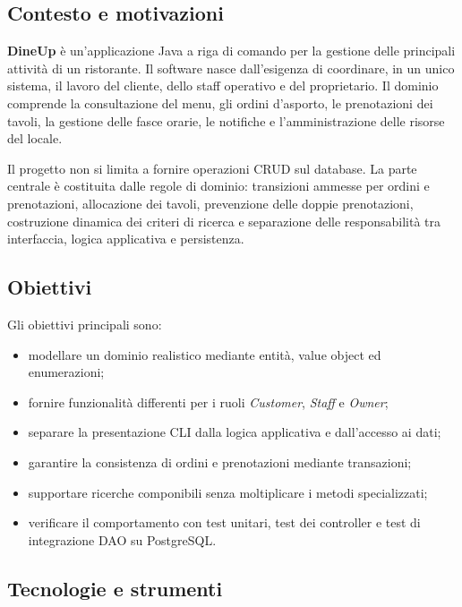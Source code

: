 \documentclass[12pt,a4paper]{article}
\newcommand{\project}{\textbf{DineUp}}
\begin{document}
\subsection{Contesto e motivazioni}

\project{} è un'applicazione Java a riga di comando per la gestione delle principali
attività di un ristorante. Il software nasce dall'esigenza di coordinare, in un unico
sistema, il lavoro del cliente, dello staff operativo e del proprietario. Il dominio
comprende la consultazione del menu, gli ordini d'asporto, le prenotazioni dei tavoli,
la gestione delle fasce orarie, le notifiche e l'amministrazione delle risorse del locale.

Il progetto non si limita a fornire operazioni CRUD sul database. La parte centrale è
costituita dalle regole di dominio: transizioni ammesse per ordini e prenotazioni,
allocazione dei tavoli, prevenzione delle doppie prenotazioni, costruzione dinamica dei
criteri di ricerca e separazione delle responsabilità tra interfaccia, logica applicativa
e persistenza.

\subsection{Obiettivi}

Gli obiettivi principali sono:

\begin{itemize}[leftmargin=*]
  \item modellare un dominio realistico mediante entità, value object ed enumerazioni;
  \item fornire funzionalità differenti per i ruoli \emph{Customer}, \emph{Staff} e
        \emph{Owner};
  \item separare la presentazione CLI dalla logica applicativa e dall'accesso ai dati;
  \item garantire la consistenza di ordini e prenotazioni mediante transazioni;
  \item supportare ricerche componibili senza moltiplicare i metodi specializzati;
  \item verificare il comportamento con test unitari, test dei controller e test di
        integrazione DAO su PostgreSQL.
\end{itemize}

\subsection{Tecnologie e strumenti}
\end{document}
